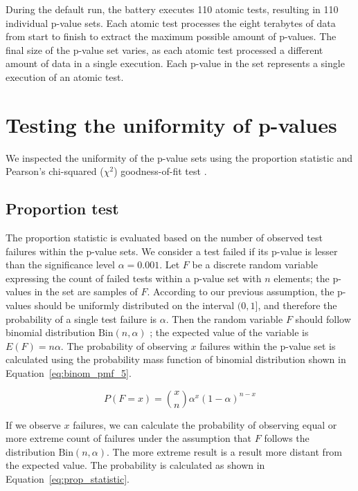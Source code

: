 \documentclass[
	digital,    %
	oneside,
	color,
	11pt,
	nocover,
	notable,
	nolof,
	nolot,
]{fithesis3}
\theoremstyle{definition}
\theoremstyle{remark}
\begin{document}
During the default run, the battery executes 110 atomic tests, resulting in 110 individual p-value sets. Each atomic test processes the eight terabytes of data from start to finish to extract the maximum possible amount of p-values. The final size of the p-value set varies, as each atomic test processed a different amount of data in a single execution. Each p-value in the set represents a single execution of an atomic test.

\section{Testing the uniformity of p-values}
\label{sec:testing_uniformity_dh}
We inspected the uniformity of the p-value sets using the proportion statistic and Pearson's chi-squared ($\chi^2$) goodness-of-fit test \cite[p.~219]{stat-handbook}.

\subsection{Proportion test}
The proportion statistic is evaluated based on the number of observed test failures within the p-value sets. We consider a test failed if its p-value is lesser than the significance level $\alpha=0.001$. Let $F$ be a discrete random variable expressing the count of failed tests within a p-value set with $n$ elements; the p-values in the set are samples of $F$. According to our previous assumption, the p-values should be uniformly distributed on the interval $(0,1]$, and therefore the probability of a single test failure is $\alpha$. Then the random variable $F$ should follow binomial distribution $\text{Bin}(n,\alpha)$ \cite[p.~245]{stat-handbook}; the expected value of the variable is $E(F) = n\alpha$. The probability of observing $x$ failures within the p-value set is calculated using the probability mass function of binomial distribution shown in Equation~\ref{eq:binom_pmf_5}.

\begin{equation}
\label{eq:binom_pmf_5}
P(F = x) = \binom xn \alpha^x(1-\alpha)^{n-x}
\end{equation}

If we observe $x$ failures, we can calculate the probability of observing equal or more extreme count of failures under the assumption that $F$ follows the distribution $\text{Bin}(n,\alpha)$. The more extreme result is a result more distant from the expected value. The probability is calculated as shown in Equation~\ref{eq:prop_statistic}.
\end{document}
